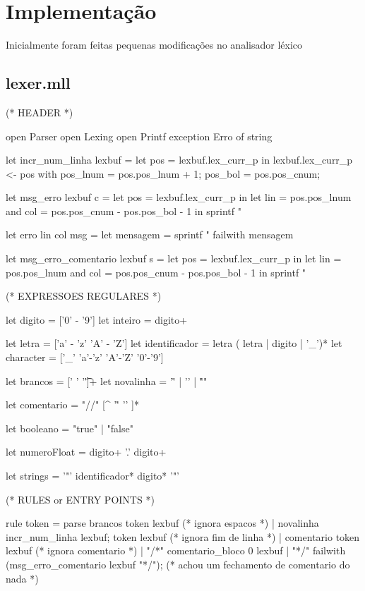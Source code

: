 \documentclass[12pt,a4paper,twoside]{report}
\begin{document}
\section{Implementação}
Inicialmente foram feitas pequenas modificações no analisador léxico
\subsection{lexer.mll}
\begin{terminal}



{ (* HEADER *)

open Parser
open Lexing
open Printf
  exception Erro of string

let incr_num_linha lexbuf =
  let pos = lexbuf.lex_curr_p in
  lexbuf.lex_curr_p <- { pos with
                         pos_lnum = pos.pos_lnum + 1;
                         pos_bol = pos.pos_cnum;
                       }

let msg_erro lexbuf c =
  let pos = lexbuf.lex_curr_p in
  let lin = pos.pos_lnum
  and col = pos.pos_cnum - pos.pos_bol - 1 in
  sprintf "%

let erro lin col msg =
  let mensagem = sprintf "%
     failwith mensagem

let msg_erro_comentario lexbuf s =
  let pos = lexbuf.lex_curr_p in
  let lin = pos.pos_lnum
  and col = pos.pos_cnum - pos.pos_bol - 1 in
  sprintf "%


}


(* EXPRESSOES REGULARES *)

let digito = ['0' - '9']
let inteiro = digito+

let letra = ['a' - 'z' 'A' - 'Z']
let identificador = letra ( letra | digito | '_')*
let character = ['_' 'a'-'z' 'A'-'Z' '0'-'9']

let brancos = [' ' '\t']+
let novalinha = '\r' | '\n' | "\r\n"

let comentario = "//" [^ '\r' '\n' ]*

let booleano = "true" | "false"

let numeroFloat = digito+ '.' digito+

let strings = '"' identificador* digito* '"'


(* RULES or ENTRY POINTS *)

rule token = parse
    brancos { token lexbuf } (* ignora espacos *)
  | novalinha { incr_num_linha lexbuf; token lexbuf } (* ignora fim de linha *)
  | comentario { token lexbuf } (* ignora comentario *)
  | "/*" { comentario_bloco 0 lexbuf }
  | "*/" { failwith (msg_erro_comentario lexbuf "*/"); } (* achou um fechamento de comentario do nada *)


\end{terminal}
\end{document}
